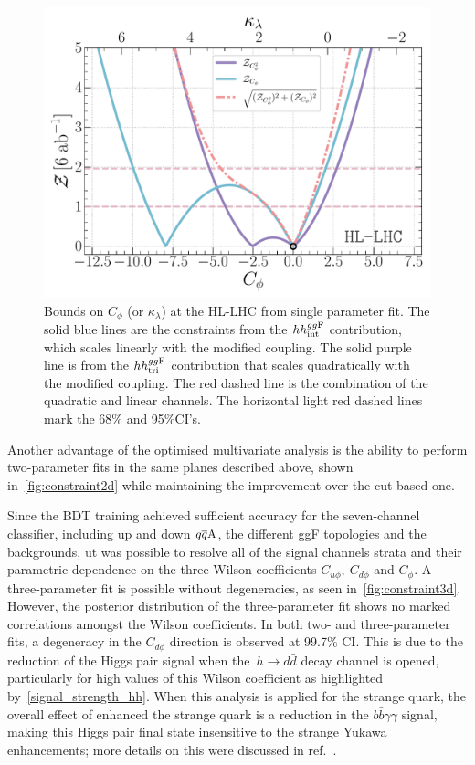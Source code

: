 \begin{figure}[h!]
	\centering
	\includegraphics[width=0.55\linewidth]{fig/HL-LHC-sig14.pdf}
	\caption{ Bounds on $C_\phi$ (or $\kappa_\lambda$) at the HL-LHC from single parameter fit. The solid blue lines are the constraints from the $hh^{gg\rm F}_{\rm int}$ contribution, which scales linearly with the modified coupling. The solid purple line is from the $hh^{gg\rm F}_{\rm tri}$ contribution that scales quadratically with the modified coupling. The red dashed line is the combination of the quadratic and linear channels. The horizontal light red dashed lines mark the 68\% and 95\%CI's.}
	\label{fig:constraintkl}
\end{figure}
Another advantage of the optimised multivariate analysis is the ability to perform two-parameter fits in the same planes described above, shown in~\autoref{fig:constraint2d} while maintaining the improvement over the cut-based one. 
\par Since the BDT training achieved sufficient accuracy for the seven-channel classifier, including up and down $q\overline q \rm A$, the different ggF topologies and the backgrounds, ut was possible to resolve all of the signal channels strata and their parametric dependence on the three Wilson coefficients $C_{u\phi},\ C_{d \phi}$ and $C_\phi$. A three-parameter fit is possible without degeneracies, as seen in~\autoref{fig:constraint3d}.  However, the posterior distribution of the three-parameter fit shows no marked correlations amongst the Wilson coefficients. In both two- and three-parameter fits, a degeneracy in the $C_{d\phi}$ direction is observed at 99.7\% CI. This is due to the reduction of the Higgs pair signal when the~$ h \to d \bar d$ decay channel is opened, particularly for high values of this Wilson coefficient as highlighted by~\autoref{signal_strength_hh}. When this analysis is applied for the strange quark, the overall effect of enhanced the strange quark is a reduction in the $ b \bar b \gamma \gamma$ signal, making this Higgs pair final state insensitive to the strange Yukawa enhancements; more details on this were discussed in ref.~\cite{Alasfar:2019pmn}. 
